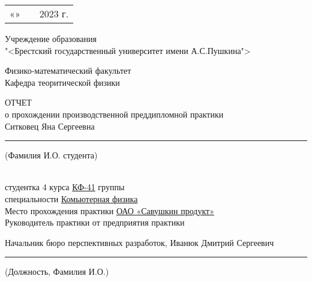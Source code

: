 \thispagestyle{empty}

\begin{FlushRight}
   \begin{tabular}{lp{2em}l} 
    «\hspace{3,5 cm}»   &&  \hspace{0.6 cm} 2023 г. \hspace{0.4 cm} \\\cline{1-1}\cline{3-3} 
    \end{tabular}
\end{FlushRight}

\vspace{20pt}
  
\begin{center}
    Учреждение образования \\
    "<Брестский государственный университет имени А.С.Пушкина"> \\
\end{center}

\begin{center}
    Физико-математический факультет \\
    Кафедра теоритической физики 
\end{center}

\begin{center}
    \MakeUppercase{отчет} \\
    о прохождении производственной преддипломной практики \\ [1\baselineskip]
    Ситковец Яна Сергеевна \\
    \hrule \hspace{0.5 cm} \footnotesize{ (Фамилия И.О. студента)} 
\end{center}
\hspace{20pt} \\
    \noindent
    студентка 4 курса \underline{КФ-41} группы \\
    специальности \underline{Комьютерная физика} \\
    Место прохождения практики \underline{ОАО «Савушкин продукт»} \\
    Руководитель практики от предприятия практики 

\begin{center}
    Начальник бюро перспективных разработок, Иванюк Дмитрий Сергеевич 
    \hrule \hspace{1 cm} \footnotesize{ (Должность, Фамилия И.О.)} 
\end{center}
\hspace{15pt}\\

